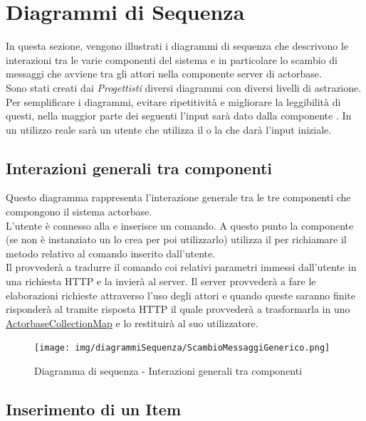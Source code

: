 \documentclass{scalatekids-article}
\begin{document}
\section{Diagrammi di Sequenza}

In questa sezione, vengono illustrati i diagrammi di sequenza che descrivono
le interazioni tra le varie componenti del sistema e in particolare lo scambio
di messaggi che avviene tra gli attori nella componente server di actorbase.\\
Sono stati creati dai \textit{Progettisti} diversi diagrammi con diversi livelli
di astrazione.\\
Per semplificare i diagrammi, evitare ripetitività e migliorare la leggibilità di
questi, nella maggior parte dei seguenti l'input sarà dato dalla componente . In un utilizzo reale sarà un utente che utilizza il  o la
 che darà l'input iniziale.

\subsection{Interazioni generali tra componenti}
Questo diagramma rappresenta l'interazione generale tra le tre componenti che
compongono il sistema actorbase.\\
L'utente è connesso alla  e inserisce un comando. A questo punto la
componente  (se non è instanziato un  lo crea per poi
utilizzarlo) utilizza il  per richiamare il metodo relativo al
comando inserito dall'utente.\\Il {} provvederà a tradurre il
comando coi relativi parametri immessi dall'utente in una richiesta HTTP
e la invierà al server. Il server provvederà a fare le elaborazioni richieste attraverso l'uso
degli attori e quando queste saranno finite risponderà al 
tramite risposta HTTP il quale provvederà a trasformarla in uno
\hyperref[sec:driver::actorbasedata::ActorbaseCollectionMap]{ActorbaseCollectionMap} e lo
restituirà al suo utilizzatore.
\begin{figure}[H]
  \begin{center}
    \texttt{[image: img/diagrammiSequenza/ScambioMessaggiGenerico.png]}
    \caption{Diagramma di sequenza - Interazioni generali tra componenti}
  \end{center}
\end{figure}

\subsection{Inserimento di un Item}
\end{document}
